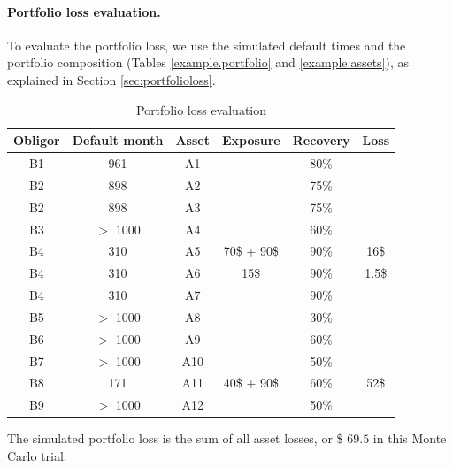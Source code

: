\documentclass[a4paper,12pt,final]{article}
\begin{document}
\paragraph{Portfolio loss evaluation.} To evaluate the portfolio loss, 
we use the simulated default times and the portfolio composition (Tables 
\ref{example.portfolio} and \ref{example.assets}), as explained in Section 
\ref{sec:portfolioloss}.
{\small
\begin{table}[!hbt]
\begin{center}
\begin{tabular}[]{|c|c|c|c|c|c|}
Obligor  & Default month & Asset & Exposure    & Recovery & Loss  \\
\hline
B1       & 961           &  A1   &             &  80\%    &       \\
B2       & 898           &  A2   &             &  75\%    &       \\
B2       & 898           &  A3   &             &  75\%    &       \\
B3       & $>$ 1000      &  A4   &             &  60\%    &       \\
B4       & 310           &  A5   & 70\$ + 90\$ &  90\%    &  16\$ \\
B4       & 310           &  A6   & 15\$        &  90\%    & 1.5\$ \\
B4       & 310           &  A7   &             &  90\%    &       \\
B5       & $>$ 1000      &  A8   &             &  30\%    &       \\
B6       & $>$ 1000      &  A9   &             &  60\%    &       \\
B7       & $>$ 1000      &  A10  &             &  50\%    &       \\
B8       & 171           &  A11  & 40\$ + 90\$ &  60\%    &  52\$ \\
B9       & $>$ 1000      &  A12  &             &  50\%    &       \\
\end{tabular}
\caption{Portfolio loss evaluation}
\end{center}
\end{table}
}

The simulated portfolio loss is the sum of all asset losses, or \$ $69.5$ 
in this Monte Carlo trial. 

\FloatBarrier
\end{document}
